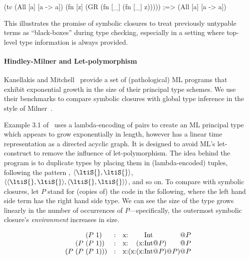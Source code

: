 \documentclass[11pt]{iuthesis}
\begin{document}
\begin{cljlisting}
(tc (All [a] [a -> a])
    (fn [z]
      (GR (fn [_] (fn [_] z)))))
;=> (All [a] [a -> a])
\end{cljlisting}

This illustrates the promise of symbolic closures to treat previously untypable terms
as ``black-boxes'' during type checking, especially in a setting where top-level
type information is always provided.

\paragraph{Hindley-Milner and Let-polymorphism}
%
Kanellakis and Mitchell~\cite{kanellakis1989polymorphic}
provide a set of (pathological) ML programs that exhibit exponential
growth in the size of their principal type schemes.
We use their benchmarks to compare symbolic closures with
global type inference in the style of Milner~\cite{milner1978theory}.

Example 3.1 of~\cite{kanellakis1989polymorphic} uses a lambda-encoding of pairs to create an ML principal type
which appears to grow exponentially in length, however has a linear time representation as a directed acyclic graph.
It is designed to avoid ML's let-construct to remove the influence of let-polymorphism.
The idea behind the program is to duplicate types \ltiS{} by placing them in (lambda-encoded) tuples,
following the pattern \ltiS{}, $\langle\ltiS{},\ltiS{}\rangle$, $\langle\langle\ltiS{},\ltiS{}\rangle,\langle\ltiS{},\ltiS{}\rangle\rangle$,
and so on.
To compare with symbolic closures,
let $P$ stand for (copies of) the code  in the following, where the left
hand side term has the right hand side type.
We can see the size of the type grows linearly in the number of occurrences of $P$---specifically,
the outermost symbolic closure's \emph{environment} increases in size.

{
\[
\begin{array}{c@{}c@{}c@{}c@{}ccr@{}r@{}r@{}r@{}r@{}r@{}r@{}r@{}r}
  &&{(P\ 1)}&&        & : &    \ltiClosure{\hastype{\text{x}}{&&&\text{Int}&&}&}{P}\\
  &{(P\ } &{(P\ 1)}& {)}&    & : &   \ltiClosure{\hastype{\text{x}}
                                                 {&&(\ltiClosure{\hastype{\text{x}}{&\text{Int}&}}{{P}})&&}}
                                                {P}\\
{(P\ }&{(P\ }&{(P\ 1)}&{)}&{)}    & : &   \ltiClosure{\hastype{\text{x}}
                                                      {&(\ltiClosure{\hastype{\text{x}}{&(\ltiClosure{\hastype{\text{x}}{&\text{Int}&}}{{P}})&}}{{P}})}&}
                                                     {P}
\end{array}
\]
}
\end{document}
